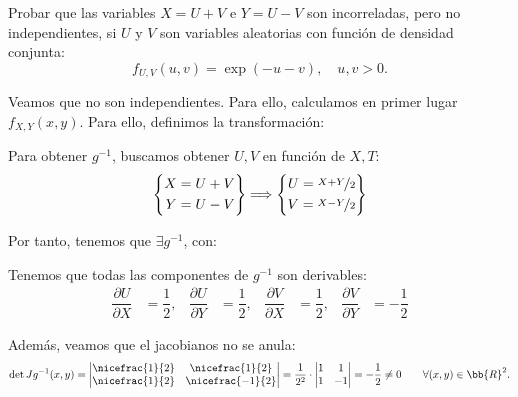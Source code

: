 \begin{ejercicio} \label{ej:4.7}
    Probar que las variables $X = U + V$ e $Y = U - V$ son incorreladas, pero no independientes, si $U$ y $V$ son variables aleatorias con función de densidad conjunta:
    \begin{equation*}
        f_{U,V}(u, v) = \exp(-u-v), \quad u, v > 0.
    \end{equation*}


    Veamos que no son independientes. Para ello, calculamos en primer lugar $f_{X,Y}(x, y)$. Para ello, definimos la transformación:

    Para obtener $g^{-1}$, buscamos obtener $U,V$ en función de $X,T$:
    \begin{equation*}
        \left\{
            \begin{aligned}
                X=U+V\\
                Y=U-V
            \end{aligned}
        \right\}
        \Longrightarrow
        \left\{
            \begin{aligned}
                U=\nicefrac{X+Y}{2}\\
                V=\nicefrac{X-Y}{2}
            \end{aligned}
        \right\}
    \end{equation*}

    Por tanto, tenemos que $\exists g^{-1}$, con:

    Tenemos que todas las componentes de $g^{-1}$ son derivables:
    \begin{align*}
        \dfrac{\partial U}{\partial X} &= \dfrac{1}{2}, & \dfrac{\partial U}{\partial Y} &= \dfrac{1}{2}, & \dfrac{\partial V}{\partial X} &= \dfrac{1}{2}, & \dfrac{\partial V}{\partial Y} &= -\dfrac{1}{2}
    \end{align*}

    Además, veamos que el jacobianos no se anula:
    \begin{equation*}
        \det Jg^{-1}(x,y)=\begin{vmatrix}
            \nicefrac{1}{2} & \nicefrac{1}{2}\\
            \nicefrac{1}{2} & \nicefrac{-1}{2}
        \end{vmatrix}=
        \dfrac{1}{2^2}\cdot \begin{vmatrix}
            1 & 1\\
            1 & -1
        \end{vmatrix}=
        -\frac{1}{2}\neq 0 \qquad \forall (x,y)\in\bb{R}^2.
    \end{equation*}


\end{ejercicio}
